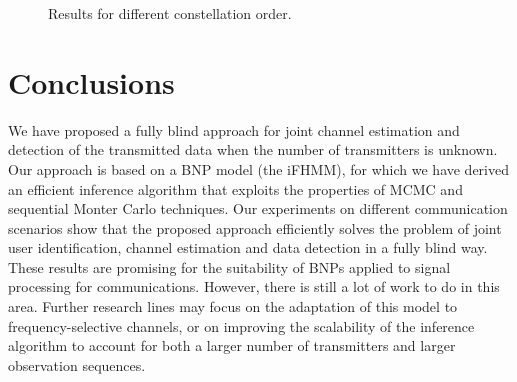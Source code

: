 \documentclass[a4paper]{article}
\begin{document}
\begin{figure}[th]
\centering
{}
\vspace*{-3mm}
\caption{Results for different constellation order.}\label{fig:resultsM}
\vspace*{-4mm}
\end{figure}

\section{Conclusions}
\label{sec:conclusions}
We have proposed a fully blind approach for joint channel estimation and detection of the transmitted data when the number of transmitters is unknown. Our approach is based on a BNP model (the iFHMM), for which we have derived an efficient inference algorithm that exploits the properties of MCMC and sequential Monter Carlo techniques. Our experiments on different communication scenarios show that the proposed approach efficiently solves the problem of joint user identification, channel estimation and data detection in a fully blind way.
%
These results are promising for the suitability of BNPs applied to signal processing for communications. However, there is still a lot of work to do in this area. Further research lines may focus on the adaptation of this model to frequency-selective channels, or on improving the scalability of the inference algorithm to account for both a larger number of transmitters and larger observation sequences.  






\end{document}
